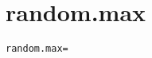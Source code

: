 \section{random.max}
\label{configuration:RandomMax}
\ClearAPI
\TODO
\begin{lstlisting}[style=Props,caption={Usage example for \textit{random.max}}]
random.max=
\end{lstlisting}